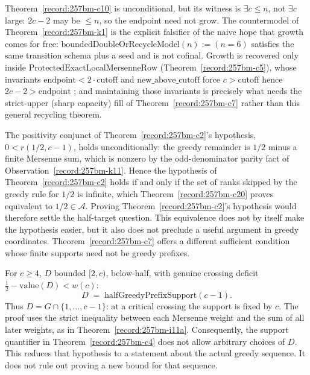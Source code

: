 \begin{thm}\label{record:257bm-k4}
Theorem~\ref{record:257bm-c10} is unconditional, but its
witness is $\exists c\le n$, not $\exists c$ large: $2c-2$ may be $\le n$, so the endpoint need
not grow. The countermodel of Theorem~\ref{record:257bm-k1} is the
explicit falsifier of the naive hope that growth comes for free:
$\mathrm{boundedDoubleOrRecycleModel}(n):=(n=6)$ satisfies the same transition schema plus a
seed and is not cofinal. Growth is recovered only inside
$\mathrm{ProtectedExactLocalMersenneRow}$ (Theorem~\ref{record:257bm-c5}), whose invariants
$\mathrm{endpoint}<2\cdot\mathrm{cutoff}$ and $\mathrm{new\_above\_cutoff}$ force $c>\mathrm{cutoff}$
hence $2c-2>\mathrm{endpoint}$ ;  and maintaining those invariants is precisely what needs the
strict-upper (sharp capacity) fill of Theorem~\ref{record:257bm-c7} rather than this general recycling theorem.
\end{thm}

\begin{obs}\label{record:257bm-k5}
The positivity conjunct of Theorem~\ref{record:257bm-c2}'s hypothesis,
$0<\ensuremath{r}(1/2,c{-}1)$, holds unconditionally: the greedy remainder is $1/2$ minus a
finite Mersenne sum, which is nonzero by the odd-denominator parity fact of
Observation~\ref{record:257bm-k11}. Hence the hypothesis of Theorem~\ref{record:257bm-c2}
holds if and only if the set of ranks skipped by the greedy rule for $1/2$ is infinite,
which Theorem~\ref{record:257bm-c20} proves equivalent to $1/2\in\ensuremath{\mathcal A}$. Proving Theorem~\ref{record:257bm-c2}'s hypothesis would therefore settle
the half-target question.  This equivalence does not by itself make the
hypothesis easier, but it also does not preclude a useful argument in
greedy coordinates.  Theorem~\ref{record:257bm-c7} offers a different
sufficient condition whose finite supports need not be greedy prefixes.
\par\noindent   {}
\end{obs}

\begin{thm}\label{record:257rig-k6}
For $c\ge4$, $D$ bounded $[2,c)$, below-half, with genuine crossing deficit
$\tfrac12-\mathrm{value}(D) < \ensuremath{w}(c)$:
\[
D \;=\; \mathrm{halfGreedyPrefixSupport}(c-1).
\]
Thus $D=G\cap\{1,\ldots,c-1\}$: at a critical crossing the support is
fixed by $c$.  The proof uses the strict inequality between each Mersenne
weight and the sum of all later weights, as in
Theorem~\ref{record:257bm-i11a}.  Consequently, the support quantifier in
Theorem~\ref{record:257bm-c4} does not allow arbitrary choices of $D$.
This reduces that hypothesis to a statement about the actual greedy
sequence.  It does not rule out proving a new bound for that sequence.
\end{thm}

